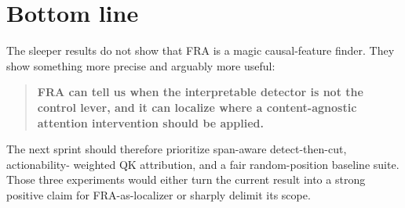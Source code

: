 \documentclass[11pt]{article}
\theoremstyle{definition}
\theoremstyle{plain}
\theoremstyle{remark}
\begin{document}
\section{Bottom line}

The sleeper results do not show that FRA is a magic causal-feature finder.  They
show something more precise and arguably more useful:
\begin{quote}
\textbf{FRA can tell us when the interpretable detector is not the control lever,
and it can localize where a content-agnostic attention intervention should be
applied.}
\end{quote}
The next sprint should therefore prioritize span-aware detect-then-cut, actionability-
weighted QK attribution, and a fair random-position baseline suite.  Those three
experiments would either turn the current result into a strong positive claim for
FRA-as-localizer or sharply delimit its scope.
\end{document}
